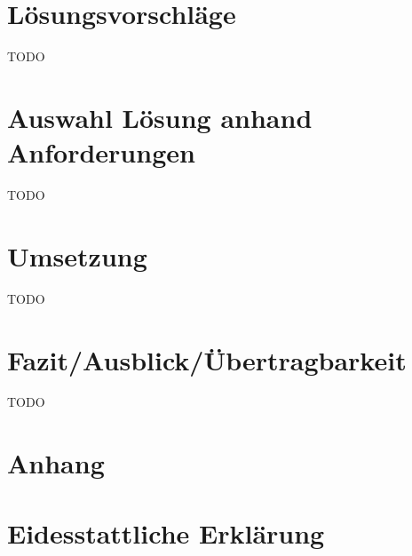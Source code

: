 \documentclass[a4paper,11pt,singlespacing]{article}
\begin{document}
\section{Lösungsvorschläge}\label{sec:Lösungsvorschläge}
	TODO


\section{Auswahl Lösung anhand Anforderungen}\label{sec:AuswahlLösungAnhandAnforderungen}
	TODO


\section{Umsetzung}\label{sec:Umsetzung}
	TODO


\section{Fazit/Ausblick/Übertragbarkeit}\label{sec:Fazit/Ausblick/Übertragbarkeit}
	TODO


\newpage




\listoffigures
{}

\lstlistoflistings
{}

\newpage

\section*{Anhang}\label{Anhang}

\newpage

\section*{Eidesstattliche Erklärung}\label{sec:Eidesstattliche Erklärung}
\end{document}
